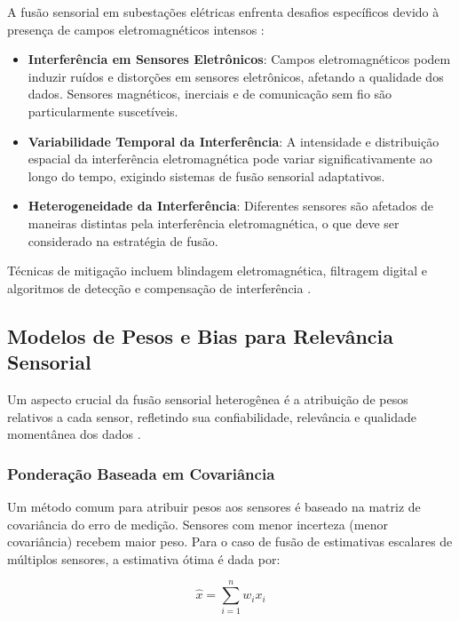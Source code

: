 A fusão sensorial em subestações elétricas enfrenta desafios específicos devido à presença de campos eletromagnéticos intensos \cite{Liu2016EMC, Wang2024CombinedNav}:

\begin{itemize}
    \item \textbf{Interferência em Sensores Eletrônicos}: Campos eletromagnéticos podem induzir ruídos e distorções em sensores eletrônicos, afetando a qualidade dos dados. Sensores magnéticos, inerciais e de comunicação sem fio são particularmente suscetíveis.
    
    \item \textbf{Variabilidade Temporal da Interferência}: A intensidade e distribuição espacial da interferência eletromagnética pode variar significativamente ao longo do tempo, exigindo sistemas de fusão sensorial adaptativos.
    
    \item \textbf{Heterogeneidade da Interferência}: Diferentes sensores são afetados de maneiras distintas pela interferência eletromagnética, o que deve ser considerado na estratégia de fusão.
\end{itemize}

Técnicas de mitigação incluem blindagem eletromagnética, filtragem digital e algoritmos de detecção e compensação de interferência \cite{Wang2024CombinedNav}.

\subsection{Modelos de Pesos e Bias para Relevância Sensorial}

Um aspecto crucial da fusão sensorial heterogênea é a atribuição de pesos relativos a cada sensor, refletindo sua confiabilidade, relevância e qualidade momentânea dos dados \cite{Oliveira2021EstudoAplicacao, Schneider2018FusaoSensores}.

\subsubsection{Ponderação Baseada em Covariância}

Um método comum para atribuir pesos aos sensores é baseado na matriz de covariância do erro de medição. Sensores com menor incerteza (menor covariância) recebem maior peso. Para o caso de fusão de estimativas escalares de múltiplos sensores, a estimativa ótima é dada por:

\begin{equation}
\hat{x} = \sum_{i=1}^{n} w_i x_i
\end{equation}

